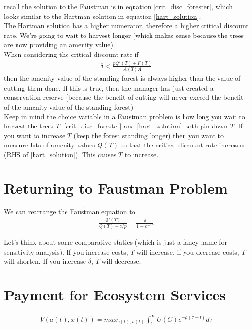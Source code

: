 \documentclass[12pt]{article}
\begin{document}
recall the solution to the Faustman is in equation \ref{crit_disc_forester}, which looks similar to the Hartman solution in equation \ref{hart_solution}. \\

The Hartman solution has a higher numerator, therefore a higher critical discount rate. We're going to wait to harvest longer (which makes sense because the trees are now providing an amenity value). \\

When considering the critical discount rate if 
\begin{align}
    \delta < \frac{pQ'(T) + F(T)}{A(T)A} \label{hart_solution}
\end{align}
then the amenity value of the standing forest is always higher than the value of cutting them done. If this is true, then the manager has just created a conservation reserve (because the benefit of cutting will never exceed the benefit of the amenity value of the standing forest). \\

Keep in mind the choice variable in a Faustman problem is how long you wait to harvest the trees $T$. \ref{crit_disc_forester} and \ref{hart_solution} both pin down $T$. If you want to increase $T$ (keep the forest standing longer) then you want to measure lots of amenity values $Q(T)$ so that the critical discount rate increases (RHS of \ref{hart_solution}). This causes $T$ to increase. 


\section{Returning to Faustman Problem}
We can rearrange the Faustman equation to 
\begin{align}
    \frac{Q'(T)}{Q(T) - c/p} = \frac{\delta}{1 - e^{-\delta T}}
\end{align}

Let's think about some comparative statics (which is just a fancy name for sensitivity analysis). If you increase costs, $T$ will increase. if you decrease costs, $T$ will shorten. If you increase $\delta$, $T$ will decrease. 

\section{Payment for Ecosystem Services}

\begin{align}
    V(a(t), x(t)) = max_{c(t), h(t)} \int_t^\infty U(C) e^{-\rho(\tau - t)}d \tau
\end{align}
\end{document}
